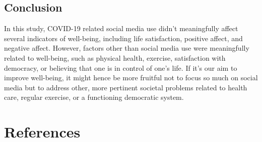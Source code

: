 \documentclass[
  english,
  man,floatsintext]{apa6}
\begin{document}
\hypertarget{conclusion}{%
\subsection{Conclusion}\label{conclusion}}

In this study, COVID-19 related social media use didn't meaningfully affect several indicators of well-being, including life satisfaction, positive affect, and negative affect.
However, factors other than social media use were meaningfully related to well-being, such as physical health, exercise, satisfaction with democracy, or believing that one is in control of one's life.
If it's our aim to improve well-being, it might hence be more fruitful not to focus so much on social media but to address other, more pertinent societal problems related to health care, regular exercise, or a functioning democratic system.

\newpage

\hypertarget{references}{%
\section{References}\label{references}}
\end{document}

